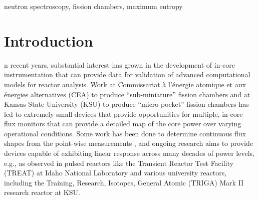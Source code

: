 \documentclass[journal]{IEEEtran}
\begin{document}
\begin{IEEEkeywords}
neutron spectroscopy, fission chambers, maximum entropy
\end{IEEEkeywords}






%
\IEEEpeerreviewmaketitle


\section{Introduction}

n recent years, substantial interest has grown in the development of in-core instrumentation that can provide data for validation of advanced computational models for reactor analysis.  Work at Commissariat \`{a} l'\'{e}nergie atomique et aux \'{e}nergies alternatives (CEA) \cite{blandin2003development} to produce ``sub-miniature'' fission chambers and  at Kansas State University (KSU) \cite{mcgregor2005micro, reichenberger2016micro} to produce ``micro-pocket'' fission chambers has led to extremely small devices that provide opportunities for multiple, in-core flux monitors that can provide a detailed map of the core power over varying operational conditions.  Some work has been done to determine continuous flux shapes from the point-wise measurements \cite{shultis2005determining}, and ongoing research aims to provide devices capable of exhibiting linear response across many decades of power levels, e.g., as observed in pulsed reactors like the Transient Reactor Test Facility (TREAT) at Idaho National Laboratory and various university reactors, including the Training, Research, Isotopes, General Atomic (TRIGA) Mark II research reactor at KSU.
\end{document}
